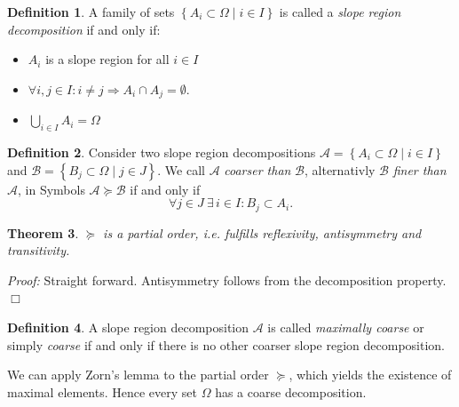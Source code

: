 \documentclass[a4paper,12pt,notitlepage,fullpage]{paper}
\theoremstyle{plain}
\newtheorem{thm}{Theorem}[section] %
\theoremstyle{definition}
\newtheorem{defn}[thm]{Definition} %
\begin{document}
\begin{defn}
A family of sets $\left\{ A_i \subset \Omega \mid i \in I \right\}$ is called a \emph{slope region decomposition} if and only if:
\begin{itemize}
\item $A_i$ is a slope region for all $i \in I$
\item $\forall i,j \in I: i \neq j \Rightarrow A_i \cap A_j = \emptyset$.
\item $\bigcup_{i\in I} A_i = \Omega$
\end{itemize}
\end{defn}



\begin{defn}
Consider two slope region decompositions $\mathcal{A} = \left\{ A_i \subset \Omega \mid i \in I \right\}$ and $\mathcal{B} = \left\{ B_j \subset \Omega \mid j \in J \right\}$.
We call $\mathcal{A}$ \emph{coarser than} $\mathcal{B}$, alternativly $\mathcal{B}$ \emph{finer than} $\mathcal{A}$, in Symbols $\mathcal{A} \succeq \mathcal{B}$ if and only if
\begin{equation*}
\forall j \in J ~ \exists \, i \in I: B_j \subset A_i.
\end{equation*}
\end{defn}

\begin{thm}
$\succeq$ is a partial order, i.e. fulfills reflexivity, antisymmetry and transitivity.
\end{thm}
\emph{Proof:} Straight forward. Antisymmetry follows from the decomposition property. \hfill $\Box$

\begin{defn}
A slope region decomposition $\mathcal{A}$ is called \emph{maximally coarse} or simply \emph{coarse} if and only if there is no other coarser slope region decomposition.
\end{defn}

We can apply Zorn's lemma to the partial order $\succeq$, which yields the existence of maximal elements.
Hence every set $\Omega$ has a coarse decomposition.
\end{document}
